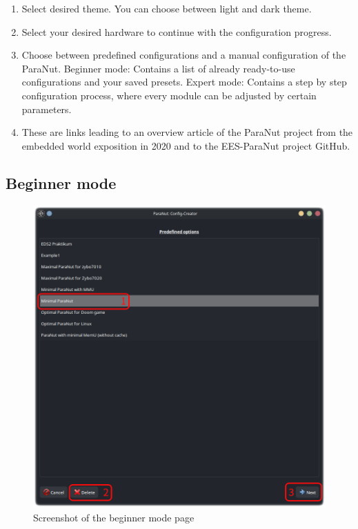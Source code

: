 \begin{enumerate}
	\item Select desired theme. You can choose between light and dark theme.
	\item Select your desired hardware to continue with the configuration progress.
	\item Choose between predefined configurations and a manual configuration of the ParaNut.
Beginner mode:
Contains a list of already \glqq ready-to-use\grqq{} configurations and your saved presets.
Expert mode:
Contains a step by step configuration process, where every module can be adjusted by certain parameters.
	\item These are links leading to an overview article of the ParaNut project from the embedded world exposition in 2020 and to the EES-ParaNut project GitHub.
\end{enumerate}

\newpage
\subsection{Beginner mode}

\begin{figure}[!h]
    \noindent \begin{centering}
        \includegraphics[width=15cm]{images/pn_config_creator_auto_page}
        \par\end{centering}
    \caption{Screenshot of the beginner mode page}
\end{figure}

